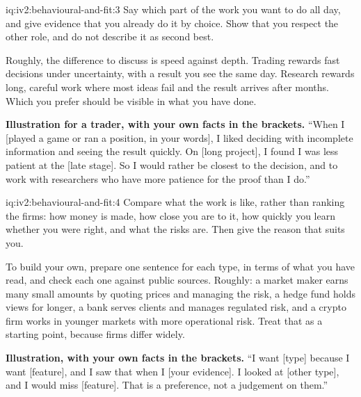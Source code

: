 \begin{solution}{iq:iv2:behavioural-and-fit:3}
Say which part of the work you want to do all day, and give evidence that you already do it by choice. Show that you respect the other role, and do not describe it as second best.

Roughly, the difference to discuss is speed against depth. Trading rewards fast decisions under uncertainty, with a result you see the same day. Research rewards long, careful work where most ideas fail and the result arrives after months. Which you prefer should be visible in what you have done.

\textbf{Illustration for a trader, with your own facts in the brackets.} ``When I [played a game or ran a position, in your words], I liked deciding with incomplete information and seeing the result quickly. On [long project], I found I was less patient at the [late stage]. So I would rather be closest to the decision, and to work with researchers who have more patience for the proof than I do.''

\end{solution}

\begin{solution}{iq:iv2:behavioural-and-fit:4}
Compare what the work is like, rather than ranking the firms: how money is made, how close you are to it, how quickly you learn whether you were right, and what the risks are. Then give the reason that suits you.

To build your own, prepare one sentence for each type, in terms of what you have read, and check each one against public sources. Roughly: a market maker earns many small amounts by quoting prices and managing the risk, a hedge fund holds views for longer, a bank serves clients and manages regulated risk, and a crypto firm works in younger markets with more operational risk. Treat that as a starting point, because firms differ widely.

\textbf{Illustration, with your own facts in the brackets.} ``I want [type] because I want [feature], and I saw that when I [your evidence]. I looked at [other type], and I would miss [feature]. That is a preference, not a judgement on them.''

\end{solution}

